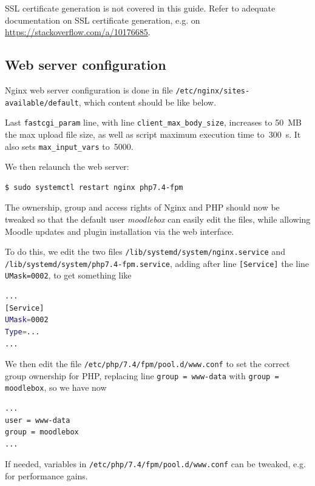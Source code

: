 \documentclass[12pt]{article}
\begin{document}
SSL certificate generation is not covered in this guide.
Refer to adequate documentation on SSL certificate generation, e.g. on \url{https://stackoverflow.com/a/10176685}.

\subsection{Web server configuration}

Nginx web server configuration is done in file \lstinline{/etc/nginx/sites-available/default}, which content should be like below.


Last \lstinline{fastcgi_param} line, with line \lstinline{client_max_body_size}, increases to 50~MB the max upload file size, as well as script maximum execution time to~300~s.
It also sets \lstinline{max_input_vars} to~5000.

We then relaunch the web server:
\begin{lstlisting}[language=bash]
$ sudo systemctl restart nginx php7.4-fpm
\end{lstlisting}

The ownership, group and access rights of Nginx and PHP should now be tweaked so that the default user \emph{moodlebox} can easily edit the files, while allowing Moodle updates and plugin installation via the web interface.

To do this, we edit the two files \lstinline{/lib/systemd/system/nginx.service} and \lstinline{/lib/systemd/system/php7.4-fpm.service}, adding after line \lstinline{[Service]} the line \lstinline{UMask=0002}, to get something like
\begin{lstlisting}[language=bash]
...
[Service]
UMask=0002
Type=...
...
\end{lstlisting}
We then edit the file \lstinline{/etc/php/7.4/fpm/pool.d/www.conf} to set the correct group ownership for PHP, replacing line \lstinline{group = www-data} with \lstinline{group = moodlebox}, so we have now
\begin{lstlisting}[language=bash]
...
user = www-data
group = moodlebox
...
\end{lstlisting}
If needed, variables in \lstinline{/etc/php/7.4/fpm/pool.d/www.conf} can be tweaked, e.g. for performance gains.
\end{document}
